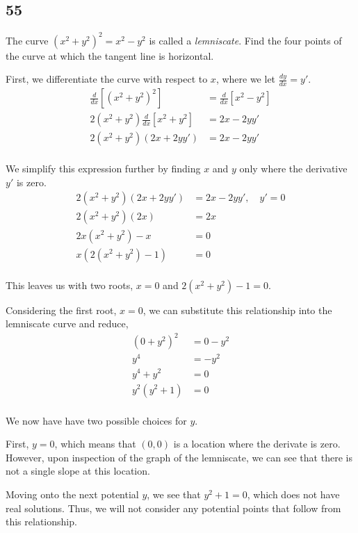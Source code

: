 \documentclass[../hw3.tex]{subfiles}
\begin{document}
\subsection*{55}
The curve ${\left(x^2 + y^2\right)}^2 = x^2-y^2$ is called a \textit{lemniscate}. Find the four points of the curve at which the tangent line is horizontal.


First, we differentiate the curve with respect to $x$, where we let $\frac{dy}{dx} = y'$.
\begin{align*}
    \frac{d}{dx} \left[ {\left(x^2 + y^2\right)}^2 \right] &= \frac{d}{dx} \left[ x^2-y^2 \right] \\
    2\left(x^2+y^2\right) \frac{d}{dx} \left[ x^2 + y^2 \right] &= 2x-2yy' \\
    2\left(x^2+y^2\right) (2x+2yy') &= 2x-2yy' \\
\end{align*}

We simplify this expression further by finding $x$ and $y$ only where the derivative $y'$ is zero.
\begin{align*}
    2\left(x^2+y^2\right) (2x+2yy') &= 2x-2yy',\quad y'=0 \\
    2\left(x^2+y^2\right)(2x) &= 2x \\
    2x\left(x^2+y^2\right) - x &= 0 \\
    x\left(2\left(x^2+y^2\right)-1\right) &= 0 \\
\end{align*}

This leaves us with two roots, $x = 0$ and $2\left(x^2+y^2\right)-1=0$. 

Considering the first root, $x=0$, we can substitute this relationship into the lemniscate curve and reduce,
\begin{align*}
    {(0+y^2)}^2 &= 0 - y^2\\
    y^4 &= -y^2 \\
    y^4 + y^2 &= 0 \\
    y^2(y^2 + 1) &= 0 \\
\end{align*}

We now have have two possible choices for $y$. 

First, $y = 0$, which means that $(0,0)$ is a location where the derivate is zero. However, upon inspection of the graph of the lemniscate, we can see that there is not a single slope at this location. 

Moving onto the next potential $y$, we see that $y^2+1=0$, which does not have real solutions. Thus, we will not consider any potential points that follow from this relationship.
\end{document}
